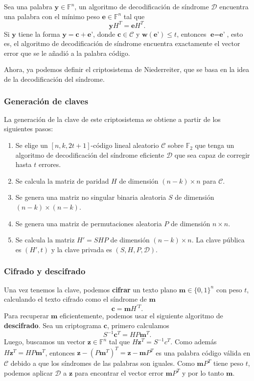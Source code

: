 Sea una palabra $\textbf{y} \in \mathbb{F}^n$, un algoritmo de decodificación de síndrome $\mathcal{D}$ encuentra una palabra con el mínimo peso $\textbf{e} \in \mathbb{F}^n$ tal que
\[
    \textbf{y} H^T = \textbf{e} H^T.
\]
Si $\textbf{y}$ tiene la forma $\textbf{y} = \textbf{c} + \textbf{e'}$, donde $\textbf{c} \in \mathcal{C}$ y $\textbf{w}(\textbf{e'}) \leq t$, entonces $\textbf{e} = \textbf{e'}$, esto es, el algoritmo de decodificación de síndrome encuentra exactamente el vector error que se le añadió a la palabra código.

Ahora, ya podemos definir el criptosistema de Niederreiter, que se basa en la idea de la decodificación del síndrome.

\subsubsection{Generación de claves}

La generación de la clave de este criptosistema se obtiene a partir de los siguientes pasos:

\begin{enumerate}
    \item Se elige un $[n, k, 2t + 1]$-código lineal aleatorio $\mathcal{C}$ sobre $\mathbb{F}_2$ que tenga un algoritmo de decodificación del síndrome eficiente $\mathcal{D}$ que sea capaz de corregir hasta $t$ errores.
    \item Se calcula la matriz de paridad $H$ de dimensión $(n - k) \times n$ para $\mathcal{C}$.
    \item Se genera una matriz no singular binaria aleatoria $S$ de dimensión $(n - k) \times (n - k)$.
    \item Se genera una matriz de permutaciones aleatoria $P$ de dimensión $n \times n$.
    \item Se calcula la matriz $H' = SHP$ de dimensión $(n - k) \times n$. La clave pública es $(H', t)$ y la clave privada es $(S, H, P, \mathcal{D})$.
\end{enumerate}

\subsubsection{Cifrado y descifrado}

Una vez tenemos la clave, podemos \textbf{cifrar} un texto plano $\textbf{m} \in \{ 0, 1 \}^n$ con peso $t$, calculando el texto cifrado como el síndrome de $\textbf{m}$
\[
    \textbf{c} = \textbf{m} H^{'T}.
\]
Para recuperar $\textbf{m}$ eficientemente, podemos usar el siguiente algoritmo de \textbf{descifrado}. Sea un criptograma $\textbf{c}$, primero calculamos
\[
    S^{-1} \textbf{c}^T = H P \textbf{m}^T.
\]
Luego, buscamos un vector $\textbf{z} \in \mathbb{F}^n$ tal que $H \textbf{z}^T = S^{-1}c^T$. Como además $H \textbf{z}^T = HP\textbf{m}^T$, entonces $\textbf{z} - (P\textbf{m}^T)^T = \textbf{z} - \textbf{m}P^T$ es una palabra código válida en $\mathcal{C}$ debido a que los síndromes de las palabras son iguales. Como $\textbf{m}P^T$ tiene peso $t$, podemos aplicar $\mathcal{D}$ a $\textbf{z}$ para encontrar el vector error $\textbf{m}P^T$ y por lo tanto $\textbf{m}$.

